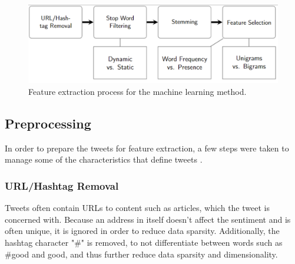 \begin{figure}
    \centering

    \includegraphics[scale=0.6]{Images/machineLearning.png}

   \caption{Feature extraction process for the machine learning method.}
    \label{fig:ml_process}
\end{figure}

\subsection{Preprocessing}
In order to prepare the tweets for feature extraction, a few steps were taken to manage some of the characteristics that define tweets \cite{DBLP:journals/csur/GiachanouC16}.

\subsubsection{URL/Hashtag Removal}
Tweets often contain URLs to content such as articles, which the tweet is concerned with. Because an address in itself doesn't affect the sentiment and is often unique, it is ignored in order to reduce data sparsity. Additionally, the hashtag character "\#" is removed, to not differentiate between words such as \#good and good, and thus further reduce data sparsity and dimensionality.


